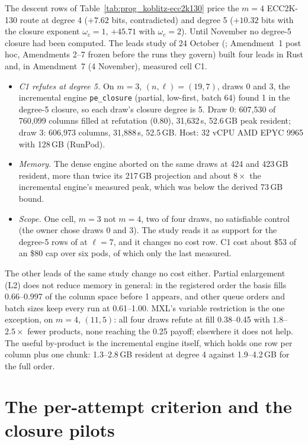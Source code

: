 The descent rows of Table~\ref{tab:prog_koblitz-ecc2k130} price the $m=4$
ECC2K-130 route at degree 4 ($+7.62$ bits, contradicted) and degree 5
($+10.32$ bits with the closure exponent $\omega_c=1$, $+45.71$ with
$\omega_c=2$). Until November no degree-5
closure had been computed. The leads study of 24 October
(; Amendment~1 post
hoc, Amendments 2--7 frozen before the runs they govern) built four leads
in Rust and, in Amendment~7 (4 November), measured cell C1.
\begin{itemize}
\item \emph{C1 refutes at degree 5.} On $m=3$, $(n,\ell)=(19,7)$, draws 0
  and 3, the incremental engine \texttt{pe\_closure} (partial, low-first,
  batch 64) found 1 in the degree-5 closure, so each draw's closure degree is
  5. Draw 0: 607{,}530 of 760{,}099 columns filled at refutation (0.80),
  31{,}632\,s, 52.6\,GB peak resident; draw 3: 606{,}973 columns, 31{,}888\,s,
  52.5\,GB. Host: 32 vCPU AMD EPYC 9965 with 128\,GB (RunPod).
\item \emph{Memory.} The dense engine aborted on the same draws at 424 and
  423\,GB resident, more than twice its 217\,GB projection and about $8\times$
  the incremental engine's measured peak, which was below the derived
  73\,GB bound.
\item \emph{Scope.} One cell, $m=3$ not $m=4$, two of four draws, no
  satisfiable control (the owner chose draws 0 and 3). The study reads it as
  support for the degree-5 rows of
   at
  $\ell=7$, and it changes no cost row. C1 cost about \$53 of an \$80 cap
  over six pods, of which only the last measured.
\end{itemize}
The other leads of the same study change no cost either. Partial
enlargement (L2) does not reduce memory in general: in the registered
order the basis fills 0.66--0.997 of the column space before 1 appears, and
other queue orders and batch sizes keep every run at 0.61--1.00. MXL's
variable restriction is the one exception, on $m=4$, $(11,5)$: all four
draws refute at fill 0.38--0.45 with $1.8$--$2.5\times$ fewer products, none
reaching the 0.25 payoff; elsewhere it does not help. The useful by-product
is the incremental engine itself, which holds one row per column plus one
chunk: 1.3--2.8\,GB resident at degree 4 against 1.9--4.2\,GB for the full
order.

\section{The per-attempt criterion and the closure pilots}\label{sec:bd-criterion}


